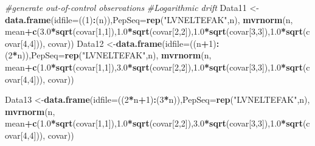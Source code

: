 \documentclass[]{article}
\newenvironment{Shaded}{\begin{snugshade}}{\end{snugshade}}
\newcommand{\KeywordTok}[1]{\textcolor[rgb]{0.13,0.29,0.53}{\textbf{#1}}}
\newcommand{\DataTypeTok}[1]{\textcolor[rgb]{0.13,0.29,0.53}{#1}}
\newcommand{\DecValTok}[1]{\textcolor[rgb]{0.00,0.00,0.81}{#1}}
\newcommand{\FloatTok}[1]{\textcolor[rgb]{0.00,0.00,0.81}{#1}}
\newcommand{\StringTok}[1]{\textcolor[rgb]{0.31,0.60,0.02}{#1}}
\newcommand{\CommentTok}[1]{\textcolor[rgb]{0.56,0.35,0.01}{\textit{#1}}}
\newcommand{\OperatorTok}[1]{\textcolor[rgb]{0.81,0.36,0.00}{\textbf{#1}}}
\newcommand{\NormalTok}[1]{#1}
\begin{document}
\begin{Shaded}
\begin{Highlighting}[]
\CommentTok{#generate out-of-control observations}
\CommentTok{#Logarithmic drift}
\NormalTok{Data11 <-}\KeywordTok{data.frame}\NormalTok{(}\DataTypeTok{idfile=}\NormalTok{((}\DecValTok{1}\NormalTok{)}\OperatorTok{:}\NormalTok{(n)),}\DataTypeTok{PepSeq=}\KeywordTok{rep}\NormalTok{(}\StringTok{"LVNELTEFAK"}\NormalTok{,n),}
                  \KeywordTok{mvrnorm}\NormalTok{(n, mean}\OperatorTok{+}\KeywordTok{c}\NormalTok{(}\FloatTok{3.0}\OperatorTok{*}\KeywordTok{sqrt}\NormalTok{(covar[}\DecValTok{1}\NormalTok{,}\DecValTok{1}\NormalTok{]),}\FloatTok{1.0}\OperatorTok{*}\KeywordTok{sqrt}\NormalTok{(covar[}\DecValTok{2}\NormalTok{,}\DecValTok{2}\NormalTok{]),}\FloatTok{1.0}\OperatorTok{*}\KeywordTok{sqrt}\NormalTok{(covar[}\DecValTok{3}\NormalTok{,}\DecValTok{3}\NormalTok{]),}\FloatTok{1.0}\OperatorTok{*}\KeywordTok{sqrt}\NormalTok{(covar[}\DecValTok{4}\NormalTok{,}\DecValTok{4}\NormalTok{])), }
\NormalTok{                          covar))}
\NormalTok{Data12 <-}\KeywordTok{data.frame}\NormalTok{(}\DataTypeTok{idfile=}\NormalTok{((n}\OperatorTok{+}\DecValTok{1}\NormalTok{)}\OperatorTok{:}\NormalTok{(}\DecValTok{2}\OperatorTok{*}\NormalTok{n)),}\DataTypeTok{PepSeq=}\KeywordTok{rep}\NormalTok{(}\StringTok{"LVNELTEFAK"}\NormalTok{,n),}
                  \KeywordTok{mvrnorm}\NormalTok{(n, mean}\OperatorTok{+}\KeywordTok{c}\NormalTok{(}\FloatTok{1.0}\OperatorTok{*}\KeywordTok{sqrt}\NormalTok{(covar[}\DecValTok{1}\NormalTok{,}\DecValTok{1}\NormalTok{]),}\FloatTok{3.0}\OperatorTok{*}\KeywordTok{sqrt}\NormalTok{(covar[}\DecValTok{2}\NormalTok{,}\DecValTok{2}\NormalTok{]),}\FloatTok{1.0}\OperatorTok{*}\KeywordTok{sqrt}\NormalTok{(covar[}\DecValTok{3}\NormalTok{,}\DecValTok{3}\NormalTok{]),}\FloatTok{1.0}\OperatorTok{*}\KeywordTok{sqrt}\NormalTok{(covar[}\DecValTok{4}\NormalTok{,}\DecValTok{4}\NormalTok{])), }
\NormalTok{                          covar))}

\NormalTok{Data13 <-}\KeywordTok{data.frame}\NormalTok{(}\DataTypeTok{idfile=}\NormalTok{((}\DecValTok{2}\OperatorTok{*}\NormalTok{n}\OperatorTok{+}\DecValTok{1}\NormalTok{)}\OperatorTok{:}\NormalTok{(}\DecValTok{3}\OperatorTok{*}\NormalTok{n)),}\DataTypeTok{PepSeq=}\KeywordTok{rep}\NormalTok{(}\StringTok{"LVNELTEFAK"}\NormalTok{,n),}
                  \KeywordTok{mvrnorm}\NormalTok{(n, mean}\OperatorTok{+}\KeywordTok{c}\NormalTok{(}\FloatTok{1.0}\OperatorTok{*}\KeywordTok{sqrt}\NormalTok{(covar[}\DecValTok{1}\NormalTok{,}\DecValTok{1}\NormalTok{]),}\FloatTok{1.0}\OperatorTok{*}\KeywordTok{sqrt}\NormalTok{(covar[}\DecValTok{2}\NormalTok{,}\DecValTok{2}\NormalTok{]),}\FloatTok{3.0}\OperatorTok{*}\KeywordTok{sqrt}\NormalTok{(covar[}\DecValTok{3}\NormalTok{,}\DecValTok{3}\NormalTok{]),}\FloatTok{1.0}\OperatorTok{*}\KeywordTok{sqrt}\NormalTok{(covar[}\DecValTok{4}\NormalTok{,}\DecValTok{4}\NormalTok{])), }
\NormalTok{                          covar))}


\end{Highlighting}
\end{Shaded}
\end{document}

